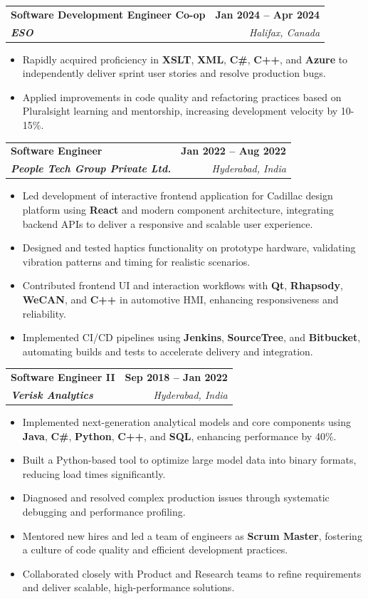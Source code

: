 \documentclass[letterpaper,11pt]{article}
\makeatletter
\newcommand{\resumeItem}[1]{
  \item\small{
    {#1 \vspace{-2pt}}
  }
}
\newcommand{\resumeSubheading}[4]{
  \vspace{-2pt}\item
    \begin{tabular*}{1.0\textwidth}[t]{l@{\extracolsep{\fill}}r}
      \textbf{#1} & \textbf{\small #2} \\
      \textit{\small#3} & \textit{\small #4} \\
    \end{tabular*}\vspace{-7pt}
}
\newcommand{\resumeItemListStart}{\begin{itemize}}
\newcommand{\resumeItemListEnd}{\end{itemize}\vspace{-5pt}}
\makeatother
\begin{document}
    \resumeSubheading
      {\textbf{Software Development Engineer Co-op}}{\textbf{Jan 2024 -- Apr 2024}}
      {\textbf{ESO}}{Halifax, Canada}
      \resumeItemListStart
        \resumeItem{Rapidly acquired proficiency in \textbf{XSLT}, \textbf{XML}, \textbf{C\#}, \textbf{C++}, and \textbf{Azure} to independently deliver sprint user stories and resolve production bugs.}
        \resumeItem{Applied improvements in code quality and refactoring practices based on Pluralsight learning and mentorship, increasing development velocity by 10-15\%.}
      \resumeItemListEnd

    \resumeSubheading
      {\textbf{Software Engineer}}{\textbf{Jan 2022 -- Aug 2022}}
      {\textbf{People Tech Group Private Ltd.}}{Hyderabad, India}
      \resumeItemListStart
        \resumeItem{Led development of interactive frontend application for Cadillac design platform using \textbf{React} and modern component architecture, integrating backend APIs to deliver a responsive and scalable user experience.}
        \resumeItem{Designed and tested haptics functionality on prototype hardware, validating vibration patterns and timing for realistic scenarios.}
        \resumeItem{Contributed frontend UI and interaction workflows with \textbf{Qt}, \textbf{Rhapsody}, \textbf{WeCAN}, and \textbf{C++} in automotive HMI, enhancing responsiveness and reliability.}
        \resumeItem{Implemented CI/CD pipelines using \textbf{Jenkins}, \textbf{SourceTree}, and \textbf{Bitbucket}, automating builds and tests to accelerate delivery and integration.}
      \resumeItemListEnd

    \resumeSubheading
      {\textbf{Software Engineer II}}{\textbf{Sep 2018 -- Jan 2022}}
      {\textbf{Verisk Analytics}}{Hyderabad, India}
      \resumeItemListStart
        \resumeItem{Implemented next-generation analytical models and core components using \textbf{Java}, \textbf{C\#}, \textbf{Python}, \textbf{C++}, and \textbf{SQL}, enhancing performance by 40\%.}
        \resumeItem{Built a Python-based tool to optimize large model data into binary formats, reducing load times significantly.}
        \resumeItem{Diagnosed and resolved complex production issues through systematic debugging and performance profiling.}
        \resumeItem{Mentored new hires and led a team of engineers as \textbf{Scrum Master}, fostering a culture of code quality and efficient development practices.}
        \resumeItem{Collaborated closely with Product and Research teams to refine requirements and deliver scalable, high-performance solutions.}
      \resumeItemListEnd
\end{document}
